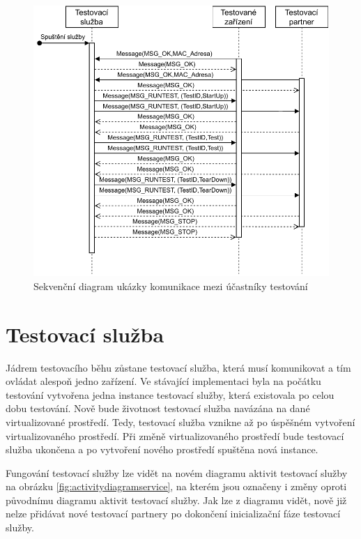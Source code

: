 \begin{figure}[htbp]
    \centering 
    \includegraphics[width=\textwidth]{assets/img/bp_assets/sequencediagram.pdf}
    \caption{Sekvenční diagram ukázky komunikace mezi účastníky testování}
    \label{fig:seqdiag}
\end{figure}

\section{Testovací služba}

Jádrem testovacího běhu zůstane testovací služba, která musí komunikovat a tím ovládat alespoň jedno zařízení. Ve stávající implementaci byla na počátku testování vytvořena jedna instance testovací služby, která existovala po celou dobu testování. Nově bude životnost testovací služba navázána na dané virtualizované prostředí. Tedy, testovací služba vznikne až po úspěšném vytvoření virtualizovaného prostředí. Při změně virtualizovaného prostředí bude testovací služba ukončena a po vytvoření nového prostředí spuštěna nová instance.

Fungování testovací služby lze vidět na novém diagramu aktivit testovací služby na obrázku \ref{fig:activitydiagramservice}, na kterém jsou označeny i změny oproti původnímu diagramu aktivit testovací služby. Jak lze z diagramu vidět, nově již nelze přidávat nové testovací partnery po dokončení inicializační fáze testovací služby.

